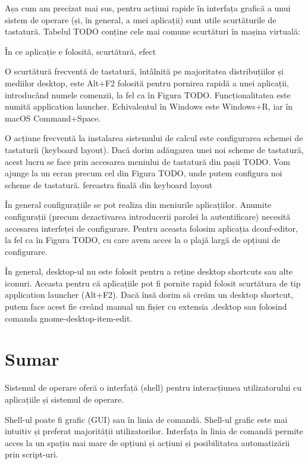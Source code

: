 Așa cum am precizat mai sus, pentru acțiuni rapide în interfața grafică a unui sistem de operare (și, în general, a unei aplicații) sunt utile scurtăturile de tastatură. Tabelul TODO conține cele mai comune scurtături în mașina virtuală:

În ce aplicație e folosită, scurtătură, efect

O scurtătură frecventă de tastatură, întâlnită pe majoritatea distribuțiilor și mediilor desktop, este Alt+F2 folosită pentru pornirea rapidă a unei aplicații, introducând numele comenzii, la fel ca în Figura TODO. Funcționalitatea este numită application launcher. Echivalentul în Windows este Windows+R, iar în macOS Command+Space.

O acțiune frecventă la instalarea sistemului de calcul este configurarea schemei de tastaturii (keyboard layout). Dacă dorim adăugarea unei noi scheme de tastatură, acest lucru se face prin accesarea meniului de tastatură din pașii TODO. Vom ajunge la un ecran precum cel din Figura TODO, unde putem configura noi scheme de tastatură.
fereastra finală din keyboard layout

În general configurațiile se pot realiza din meniurile aplicațiilor. Anumite configurații (precum dezactivarea introducerii parolei la autentificare) necesită accesarea interfeței de configurare. Pentru aceasta folosim aplicația dconf-editor, la fel ca în Figura TODO, cu care avem acces la o plajă largă de opțiuni de configurare.

În general, desktop-ul nu este folosit pentru a reține desktop shortcuts sau alte iconuri. Aceasta pentru că aplicațiile pot fi pornite rapid folosit scurtătura de tip application launcher (Alt+F2). Dacă însă dorim să creăm un desktop shortcut, putem face acest fie creând manual un fișier cu extensia .desktop sau folosind comanda gnome-desktop-item-edit.

\section{Sumar}
\label{sec:ui:summary}

Sistemul de operare oferă o interfață (shell) pentru interacțiunea utilizatorului cu aplicațiile și sistemul de operare.

Shell-ul poate fi grafic (GUI) sau în linia de comandă. Shell-ul grafic este mai intuitiv și preferat majorității utilizatorilor. Interfața în linia de comandă permite acces la un spațiu mai mare de opțiuni și acțiuni și posibilitatea automatizării prin script-uri.

